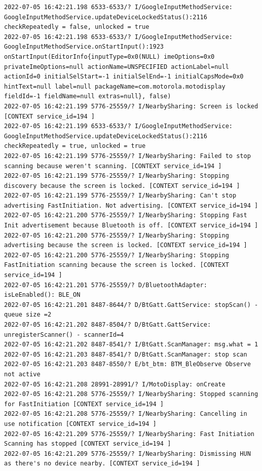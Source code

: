 \documentclass[a4paper,12pt]{book}
\begin{document}
\begin{lstlisting}
2022-07-05 16:42:21.198 6533-6533/? I/GoogleInputMethodService: GoogleInputMethodService.updateDeviceLockedStatus():2116 checkRepeatedly = false, unlocked = true
2022-07-05 16:42:21.198 6533-6533/? I/GoogleInputMethodService: GoogleInputMethodService.onStartInput():1923 onStartInput(EditorInfo{inputType=0x0(NULL) imeOptions=0x0 privateImeOptions=null actionName=UNSPECIFIED actionLabel=null actionId=0 initialSelStart=-1 initialSelEnd=-1 initialCapsMode=0x0 hintText=null label=null packageName=com.motorola.motodisplay fieldId=-1 fieldName=null extras=null}, false)
2022-07-05 16:42:21.199 5776-25559/? I/NearbySharing: Screen is locked [CONTEXT service_id=194 ]
2022-07-05 16:42:21.199 6533-6533/? I/GoogleInputMethodService: GoogleInputMethodService.updateDeviceLockedStatus():2116 checkRepeatedly = true, unlocked = true
2022-07-05 16:42:21.199 5776-25559/? I/NearbySharing: Failed to stop scanning because weren't scanning. [CONTEXT service_id=194 ]
2022-07-05 16:42:21.199 5776-25559/? I/NearbySharing: Stopping discovery because the screen is locked. [CONTEXT service_id=194 ]
2022-07-05 16:42:21.199 5776-25559/? I/NearbySharing: Can't stop advertising FastInitiation. Not advertising. [CONTEXT service_id=194 ]
2022-07-05 16:42:21.200 5776-25559/? I/NearbySharing: Stopping Fast Init advertisement because Bluetooth is off. [CONTEXT service_id=194 ]
2022-07-05 16:42:21.200 5776-25559/? I/NearbySharing: Stopping advertising because the screen is locked. [CONTEXT service_id=194 ]
2022-07-05 16:42:21.200 5776-25559/? I/NearbySharing: Stopping FastInitiation scanning because the screen is locked. [CONTEXT service_id=194 ]
2022-07-05 16:42:21.201 5776-25559/? D/BluetoothAdapter: isLeEnabled(): BLE_ON
2022-07-05 16:42:21.201 8487-8644/? D/BtGatt.GattService: stopScan() - queue size =2
2022-07-05 16:42:21.202 8487-8504/? D/BtGatt.GattService: unregisterScanner() - scannerId=4
2022-07-05 16:42:21.202 8487-8541/? I/BtGatt.ScanManager: msg.what = 1
2022-07-05 16:42:21.203 8487-8541/? D/BtGatt.ScanManager: stop scan
2022-07-05 16:42:21.203 8487-8550/? E/bt_btm: BTM_BleObserve Observe not active
2022-07-05 16:42:21.208 28991-28991/? I/MotoDisplay: onCreate
2022-07-05 16:42:21.208 5776-25559/? I/NearbySharing: Stopped scanning for FastInitiation [CONTEXT service_id=194 ]
2022-07-05 16:42:21.208 5776-25559/? I/NearbySharing: Cancelling in use notification [CONTEXT service_id=194 ]
2022-07-05 16:42:21.209 5776-25559/? I/NearbySharing: Fast Initiation Scanning has stopped [CONTEXT service_id=194 ]
2022-07-05 16:42:21.209 5776-25559/? I/NearbySharing: Dismissing HUN as there's no device nearby. [CONTEXT service_id=194 ]

\end{lstlisting}
\end{document}
